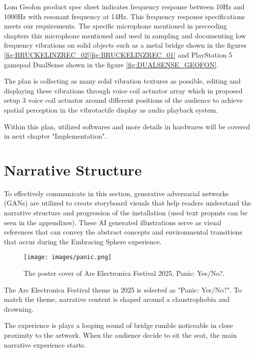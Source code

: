             Lom Geofon product spec sheet indicates frequency response between 10Hz and 1000Hz with resonant frequency at 14Hz. This frequency response specifications meets our requirements. The specific microphone mentioned in preceeding chapters this microphone mentioned and used in sampling and documenting low frequency vibrations on solid objects such as a metal bridge shown in the figures \ref{fig:BRUCKELINZREC_02}\ref{fig:BRUCKELINZREC_01} and PlayStation 5 gamepad DualSense shown in the figure \ref{fig:DUALSENSE_GEOFON}.\par

            The plan is collecting as many solid vibration textures as possible, editing and displaying these vibrations through voice coil actuator array which in proposed setup 3 voice coil actuator around different positions of the audience to achieve spatial perception in the vibrotactile display as audio playback system.\par

            Within this plan, utilized softwares and more details in hardwares will be covered in next chapter "Implementation".\par
    \section{Narrative Structure}
        To effectively communicate in this section, generative adversarial networks (GANs) are utilized to create storyboard visuals that help readers understand the narrative structure and progression of the installation (used text propmts can be seen in the appendixes). These AI generated illustrations serve as visual references that can convey the abstract concepts and environmental transitions that occur during the Embracing Sphere experience.\par

        \begin{figure}[H]
            \centering
            \texttt{[image: images/panic.png]}
            \caption{The poster cover of Ars Electronica Festival 2025, Panic: Yes/No?.}
            \label{fig:PANIC}
        \end{figure}

        The Ars Electronica Festival theme in 2025 is selected as "Panic: Yes/No?". To match the theme, narrative content is shaped around a claustrophobia and drowning.\par

        The experience is plays a looping sound of bridge rumble noticeable in close proximity to the artwork. When the audience decide to sit the seat, the main narrative experience starts.\par

